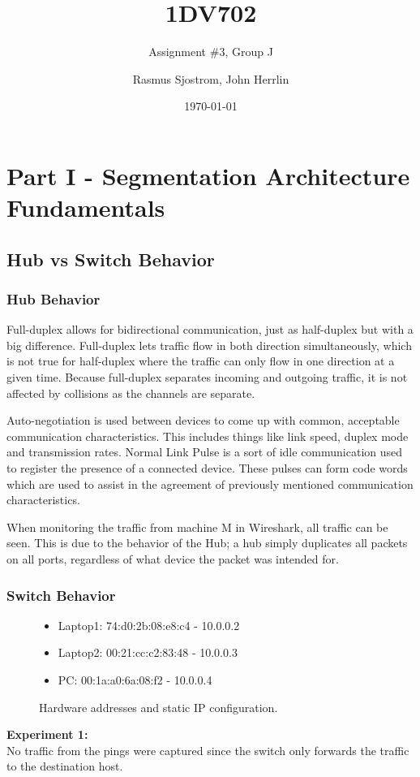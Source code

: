 \documentclass[11pt,parskip=half]{scrartcl}
\begin{document}
\author{Rasmus Sjostrom, John Herrlin}
\title{1DV702}
\subtitle{Assignment \#3, Group J}
\date{\today}
\maketitle

\tableofcontents
\newpage

\section{Part I - Segmentation Architecture Fundamentals}
\subsection{Hub vs Switch Behavior}

\subsubsection{Hub Behavior}
Full-duplex allows for bidirectional communication, just as half-duplex but with a big difference. Full-duplex lets traffic flow in both direction simultaneously, which is not true for half-duplex where the traffic can only flow in one direction at a given time. Because full-duplex separates incoming and outgoing traffic, it is not affected by collisions as the channels are separate.

Auto-negotiation is used between devices to come up with common, acceptable communication characteristics. This includes things like link speed, duplex mode and transmission rates. Normal Link Pulse is a sort of idle communication used to register the presence of a connected device. These pulses can form code words which are used to assist in the agreement of previously mentioned communication characteristics.

When monitoring the traffic from machine M in Wireshark, all traffic can be seen. This is due to the behavior of the Hub; a hub simply duplicates all packets on all ports, regardless of what device the packet was intended for.

\subsubsection{Switch Behavior}
\begin{figure}[!ht]
\begin{itemize}
\item Laptop1: 	 74:d0:2b:08:e8:c4 - 10.0.0.2
\item Laptop2:   00:21:cc:c2:83:48 - 10.0.0.3
\item PC:	  	 00:1a:a0:6a:08:f2 - 10.0.0.4
\caption{Hardware addresses and static IP configuration.}
\end{itemize}
\end{figure}
\textbf{Experiment 1:}\\
No traffic from the pings were captured since the switch only forwards
the traffic to the destination host.
\end{document}
